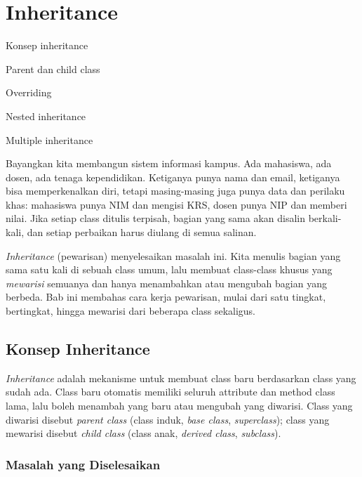 \chapter{Inheritance}

\begin{dibabini}
  \item Konsep inheritance
  \item Parent dan child class
  \item Overriding
  \item Nested inheritance
  \item Multiple inheritance
\end{dibabini}

Bayangkan kita membangun sistem informasi kampus. Ada mahasiswa, ada dosen, ada tenaga kependidikan. Ketiganya punya nama dan email, ketiganya bisa memperkenalkan diri, tetapi masing-masing juga punya data dan perilaku khas: mahasiswa punya NIM dan mengisi KRS, dosen punya NIP dan memberi nilai. Jika setiap class ditulis terpisah, bagian yang sama akan disalin berkali-kali, dan setiap perbaikan harus diulang di semua salinan.

\emph{Inheritance} (pewarisan) menyelesaikan masalah ini. Kita menulis bagian yang sama satu kali di sebuah class umum, lalu membuat class-class khusus yang \emph{mewarisi} semuanya dan hanya menambahkan atau mengubah bagian yang berbeda. Bab ini membahas cara kerja pewarisan, mulai dari satu tingkat, bertingkat, hingga mewarisi dari beberapa class sekaligus.

\section{Konsep Inheritance}

\emph{Inheritance} adalah mekanisme untuk membuat class baru berdasarkan class yang sudah ada. Class baru otomatis memiliki seluruh attribute dan method class lama, lalu boleh menambah yang baru atau mengubah yang diwarisi. Class yang diwarisi disebut \emph{parent class} (class induk, \emph{base class}, \emph{superclass}); class yang mewarisi disebut \emph{child class} (class anak, \emph{derived class}, \emph{subclass}).

\subsection{Masalah yang Diselesaikan}

